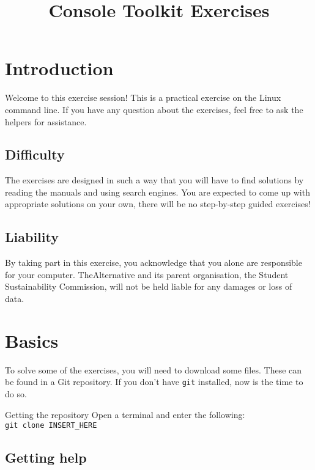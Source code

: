 \documentclass{TheAlternativeCourse}
\title{Console Toolkit Exercises}
\date{}
\begin{document}
\maketitle

\section{Introduction}

Welcome to this exercise session! This is a practical exercise on the Linux
command line.  If you have any question about the exercises, feel free to ask
the helpers for assistance.


\subsection*{Difficulty}

The exercises are designed in such a way that you will have to find solutions
by reading the manuals and using search engines. You are expected to come up
with appropriate solutions on your own, there will be no step-by-step guided
exercises!

\subsection*{Liability}

By taking part in this exercise, you acknowledge that you alone are responsible
for your computer. TheAlternative and its parent organisation, the Student
Sustainability Commission, will not be held liable for any damages or loss of
data.

\pagebreak

\section{Basics}

To solve some of the exercises, you will need to download some files. These
can be found in a Git repository. If you don't have \texttt{git} installed,
now is the time to do so. \\
%
\begin{exercisebox}{Getting the repository}
    Open a terminal and enter the following: \\
    \texttt{git clone INSERT\_HERE}
\end{exercisebox}

\subsection{Getting help}
\end{document}
